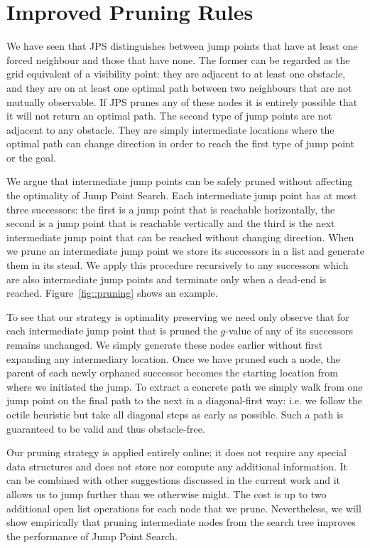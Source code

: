 \section{Improved Pruning Rules}
\label{sec::pruning}
We have seen that JPS distinguishes between jump points that have at least 
one forced neighbour and those that have none.
The former can be regarded as
the grid equivalent of a visibility point: they are adjacent to at least one
obstacle, and they are on at least one optimal path between two neighbours
that are not mutually observable. If JPS prunes any of these nodes it is
entirely possible that it will not return an optimal path.  The second type of
jump points are not adjacent to any obstacle. They are simply intermediate
locations where the optimal path can change direction in order to reach the
first type of jump point or the goal.
\par
We argue that intermediate jump points can be safely pruned without
affecting the optimality of Jump Point Search.  
Each intermediate jump point has at most three successors: the first is a jump 
point that is reachable horizontally, the second is a jump point that is reachable 
vertically and the third is the next intermediate jump point that can be reached 
without changing direction.
When we prune an intermediate jump point we store its successors in a list and
generate them in its stead. We apply this procedure recursively to any
successors which are also intermediate jump points and terminate only when a
dead-end is reached. Figure~\ref{fig::pruning} shows an example.

To see that our strategy is optimality preserving we need only observe that
for each intermediate jump point that is pruned the $g$-value of any of its
successors remains unchanged. We simply generate these nodes earlier without
first expanding any intermediary location.  Once we have pruned such a node, 
the parent of each newly orphaned successor becomes the starting location from
where we initiated the jump. To extract a concrete path we simply walk from
one jump point on the final path to the next in a diagonal-first way: i.e. we
follow the octile heuristic but take all diagonal steps as early as possible.
Such a path is guaranteed to be valid and thus obstacle-free.

Our pruning strategy is applied entirely online; it does not require any
special data structures and does not store nor compute any additional
information.  It can be combined with other suggestions discussed in the 
current work and it allows us to jump further than we otherwise might. The 
cost is up to two additional open list operations for each node that we
prune. Nevertheless, we will show empirically that pruning intermediate nodes
from the search tree improves the performance of Jump Point Search.

